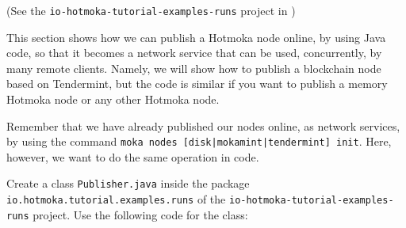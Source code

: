 \begin{center}
(See the \texttt{io-hotmoka-tutorial-examples-runs} project in \hotmokaRepo{})
\end{center}

This section shows how we can publish a Hotmoka node online, by using Java code,
so that it becomes a
network service that can be used, concurrently, by many remote clients.
Namely, we will show how to publish a blockchain node based on Tendermint, but the code
is similar if you want to publish a memory Hotmoka node or any other Hotmoka node.

Remember that we have already published our nodes online, as network services,
by using the command \texttt{moka nodes [disk|mokamint|tendermint] init}.
Here, however, we want to do the same operation in code.

Create a class \texttt{Publisher.java} inside the package
\texttt{io.hotmoka.tutorial.examples.runs}
of the \texttt{io-hotmoka-tutorial-examples-runs} project.
Use the following code for the class:
%
